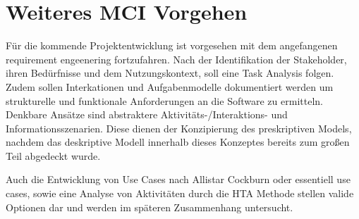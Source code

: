 
\section{Weiteres MCI Vorgehen}
Für die kommende Projektentwicklung ist vorgesehen mit dem angefangenen requirement engeenering fortzufahren. 
Nach der Identifikation der Stakeholder, ihren Bedürfnisse und dem Nutzungskontext, soll eine Task Analysis folgen.\\
Zudem sollen Interkationen und Aufgabenmodelle dokumentiert werden  um strukturelle und funktionale Anforderungen an die Software zu ermitteln. Denkbare Ansätze sind abstraktere Aktivitäts-/Interaktions- und Informationsszenarien. Diese dienen der Konzipierung des preskriptiven Models, nachdem das deskriptive Modell innerhalb dieses Konzeptes bereits zum großen Teil abgedeckt wurde.

Auch die Entwicklung von Use Cases nach Allistar Cockburn oder essentiell use cases, sowie eine Analyse von Aktivitäten durch die HTA Methode stellen valide Optionen dar und werden im späteren Zusammenhang untersucht. 
